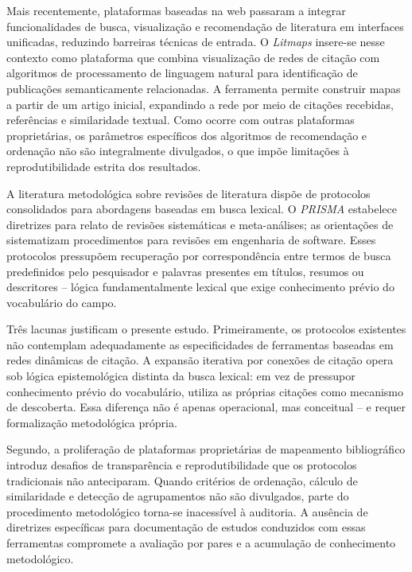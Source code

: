 \documentclass[portuguese]{textolivre}
\begin{document}
	Mais recentemente, plataformas baseadas na web passaram a integrar funcionalidades de busca, visualização e recomendação de literatura em interfaces unificadas, reduzindo barreiras técnicas de entrada. O \textit{Litmaps} insere-se nesse contexto como plataforma que combina visualização de redes de citação com algoritmos de processamento de linguagem natural para identificação de publicações semanticamente relacionadas. A ferramenta permite construir mapas a partir de um artigo inicial, expandindo a rede por meio de citações recebidas, referências e similaridade textual. Como ocorre com outras plataformas proprietárias, os parâmetros específicos dos algoritmos de recomendação e ordenação não são integralmente divulgados, o que impõe limitações à reprodutibilidade estrita dos resultados.
    
	A literatura metodológica sobre revisões de literatura dispõe de protocolos consolidados para abordagens baseadas em busca lexical. O \textit{PRISMA} \cite{Page2021} estabelece diretrizes para relato de revisões sistemáticas e meta-análises; as orientações de \textcite{Kitchenham2007} sistematizam procedimentos para revisões em engenharia de software. Esses protocolos pressupõem recuperação por correspondência entre termos de busca predefinidos pelo pesquisador e palavras presentes em títulos, resumos ou descritores – lógica fundamentalmente lexical que exige conhecimento prévio do vocabulário do campo.
    
	Três lacunas justificam o presente estudo. Primeiramente, os protocolos existentes não contemplam adequadamente as especificidades de ferramentas baseadas em redes dinâmicas de citação. A expansão iterativa por conexões de citação opera sob lógica epistemológica distinta da busca lexical: em vez de pressupor conhecimento prévio do vocabulário, utiliza as próprias citações como mecanismo de descoberta. Essa diferença não é apenas operacional, mas conceitual – e requer formalização metodológica própria.
    
	Segundo, a proliferação de plataformas proprietárias de mapeamento bibliográfico introduz desafios de transparência e reprodutibilidade que os protocolos tradicionais não anteciparam. Quando critérios de ordenação, cálculo de similaridade e detecção de agrupamentos não são divulgados, parte do procedimento metodológico torna-se inacessível à auditoria. A ausência de diretrizes específicas para documentação de estudos conduzidos com essas ferramentas compromete a avaliação por pares e a acumulação de conhecimento metodológico.
    
\end{document}
